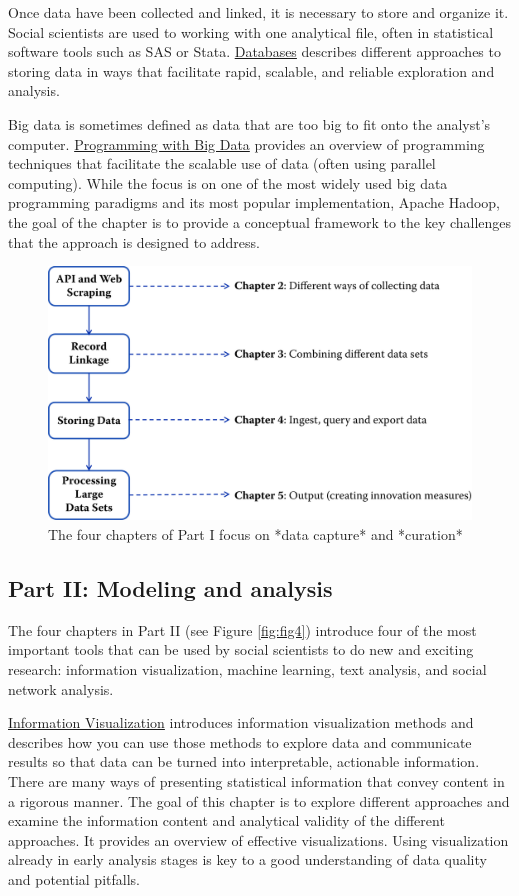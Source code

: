 \documentclass[]{krantz}
\begin{document}
Once data have been collected and linked, it is necessary to store and
organize it. Social scientists are used to working with one analytical
file, often in statistical software tools such as SAS or Stata.
\protect\hyperlink{databases}{Databases} describes different approaches
to storing data in ways that facilitate rapid, scalable, and reliable
exploration and analysis.

Big data is sometimes defined as data that are too big to fit onto the
analyst's computer. \protect\hyperlink{chap:parallel}{Programming with
Big Data} provides an overview of programming techniques that facilitate
the scalable use of data (often using parallel computing). While the
focus is on one of the most widely used big data programming paradigms
and its most popular implementation, Apache Hadoop, the goal of the
chapter is to provide a conceptual framework to the key challenges that
the approach is designed to address.

\begin{figure}

{\centering \includegraphics[width=0.7\linewidth]{ChapterIntro/figures/Figure2} 

}

\caption{The four chapters of Part I focus on *data capture* and *curation*}\label{fig:fig3}
\end{figure}

\subsection{Part II: Modeling and
analysis}\label{part-ii-modeling-and-analysis}

The four chapters in Part II (see Figure \ref{fig:fig4}) introduce four
of the most important tools that can be used by social scientists to do
new and exciting research: information visualization, machine learning,
text analysis, and social network analysis.

\protect\hyperlink{chap:viz}{Information Visualization} introduces
information visualization methods and describes how you can use those
methods to explore data and communicate results so that data can be
turned into interpretable, actionable information. There are many ways
of presenting statistical information that convey content in a rigorous
manner. The goal of this chapter is to explore different approaches and
examine the information content and analytical validity of the different
approaches. It provides an overview of effective visualizations. Using
visualization already in early analysis stages is key to a good
understanding of data quality and potential pitfalls.
\end{document}
